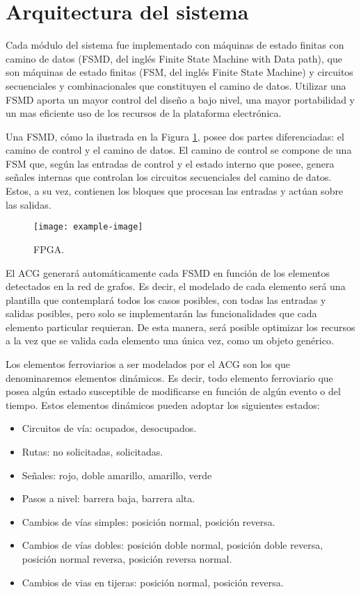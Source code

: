 \section{Arquitectura del sistema}

	Cada módulo del sistema fue implementado con máquinas de estado finitas	con camino de datos (FSMD, del inglés Finite State Machine with Data path), que son máquinas de estado finitas (FSM, del inglés Finite State Machine) y circuitos
	secuenciales y combinacionales que constituyen el camino de datos. Utilizar una FSMD aporta un mayor control del diseño a bajo nivel, una mayor portabilidad y un mas eficiente uso de los recursos de la plataforma electrónica.
	
	Una FSMD, cómo la ilustrada en la Figura \ref{fig:FSMD}, posee dos partes diferenciadas: el camino de control y el camino de datos. El camino de control se compone de una FSM que, según las entradas de control y el estado interno que posee, genera señales internas que controlan los circuitos secuenciales del camino de datos. Estos, a su vez, contienen los bloques que procesan las entradas y actúan sobre las salidas.
	
	\begin{figure}[H]
		\centering
		\texttt{[image: example-image]}
		\centering\caption{FPGA.}
		\label{fig:FSMD}
	\end{figure}
	
	El ACG generará automáticamente cada FSMD en función de los elementos detectados en la red de grafos. Es decir, el modelado de cada elemento será una plantilla que contemplará todos los casos posibles, con todas las entradas y salidas posibles, pero solo se implementarán las funcionalidades que cada elemento particular requieran. De esta manera, será posible optimizar los recursos a la vez que se valida cada elemento una única vez, como un objeto genérico.
	
	Los elementos ferroviarios a ser modelados por el ACG son los que denominaremos elementos dinámicos. Es decir, todo elemento ferroviario que posea algún estado susceptible de modificarse en función de algún evento o del tiempo. Estos elementos dinámicos pueden adoptar los siguientes estados:
	
	\begin{itemize}
		\item Circuitos de vía: ocupados, desocupados.
		\item Rutas: no solicitadas, solicitadas.
		\item Señales: rojo, doble amarillo, amarillo, verde
		\item Pasos a nivel: barrera baja, barrera alta.
		\item Cambios de vías simples: posición normal, posición reversa.
		\item Cambios de vías dobles: posición doble normal, posición doble reversa, posición normal reversa, posición reversa normal.
		\item Cambios de vias en tijeras: posición normal, posición reversa.
	\end{itemize}
	
